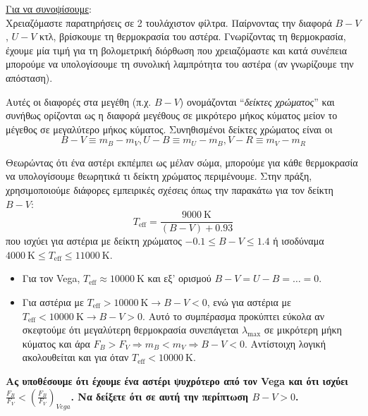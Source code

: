 \underline{Για να συνοψίσουμε}:\\
Χρειαζόμαστε παρατηρήσεις σε 2 τουλάχιστον φίλτρα. Παίρνοντας την διαφορά $B - V$, $U - V$ κτλ, βρίσκουμε τη θερμοκρασία του αστέρα. Γνωρίζοντας τη θερμοκρασία, έχουμε μία τιμή για τη βολομετρική διόρθωση που χρειαζόμαστε και κατά συνέπεια μπορούμε να υπολογίσουμε τη συνολική λαμπρότητα του αστέρα (αν γνωρίζουμε την απόσταση).

Αυτές οι διαφορές στα μεγέθη (π.χ. $B - V$) ονομάζονται ``\textit{δείκτες χρώματος}'' και συνήθως ορίζονται ως η διαφορά μεγέθους σε μικρότερο μήκος κύματος μείον το μέγεθος σε μεγαλύτερο μήκος κύματος. Συνηθισμένοι δείκτες χρώματος είναι οι $$B - V \equiv m_B - m_V, U - B \equiv m_U - m_B, V - R \equiv m_V - m_R$$

Θεωρώντας ότι ένα αστέρι εκπέμπει ως μέλαν σώμα, μπορούμε για κάθε θερμοκρασία να υπολογίσουμε θεωρητικά τι δείκτη χρώματος περιμένουμε. Στην πράξη, χρησιμοποιούμε διάφορες εμπειρικές σχέσεις όπως την παρακάτω για τον δείκτη $B-V$: 
\begin{equation}
    T_{\text{eff}} = \frac{9000 \ \text{K}}{(B - V) + 0.93}
\end{equation}
που ισχύει για αστέρια με δείκτη χρώματος $-0.1 \leq B-V \leq 1.4$ ή ισοδύναμα $4000 \ \text{K} \leq T_{\text{eff}} \leq 11000 \ \text{K}$.

\begin{itemize}
    \item Για τον Vega, $T_{\text{eff}} \approx 10000 \ \text{K}$ και εξ' ορισμού $B-V = U-B = \dots = 0$.
    \item Για αστέρια με $T_{\text{eff}} > 10000 \ \text{K} \longrightarrow B-V < 0$, ενώ για αστέρια με $T_{\text{eff}} < 10000 \ \text{K} \longrightarrow B-V > 0$. Αυτό το συμπέρασμα προκύπτει εύκολα αν σκεφτούμε ότι μεγαλύτερη θερμοκρασία συνεπάγεται $\lambda_{\text{max}}$ σε μικρότερη μήκη κύματος και άρα $F_B > F_V \Rightarrow m_B < m_V \Rightarrow B-V < 0$. Αντίστοιχη λογική ακολουθείται και για όταν $T_{\text{eff}} < 10000 \ \text{K}$.
\end{itemize}


\textbf{Ας υποθέσουμε ότι έχουμε ένα αστέρι ψυχρότερο από τον Vega και ότι ισχύει $\displaystyle \frac{F_B}{F_V} < \left( \frac{F_B}{F_V} \right)_{Vega}$. Να δείξετε ότι σε αυτή την περίπτωση $B-V > 0$.}


